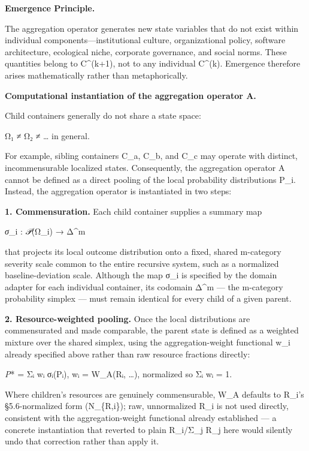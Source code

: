 \documentclass[
]{article}
\begin{document}
\textbf{Emergence Principle.}

The aggregation operator generates new state variables that do not exist
within individual components---institutional culture, organizational
policy, software architecture, ecological niche, corporate governance,
and social norms. These quantities belong to C\^{}(k+1), not to any
individual C\^{}(k). Emergence therefore arises mathematically rather
than metaphorically.

\textbf{Computational instantiation of the aggregation operator A.}

Child containers generally do not share a state space:

Ω₁ ≠ Ω₂ ≠ \ldots{} in general.

For example, sibling containers C\_a, C\_b, and C\_c may operate with
distinct, incommensurable localized states. Consequently, the
aggregation operator A cannot be defined as a direct pooling of the
local probability distributions P\_i. Instead, the aggregation operator
is instantiated in two steps:

\textbf{1. Commensuration.} Each child container supplies a summary map

\emph{σ}\_i : \emph{𝒫}(Ω\_i) → Δ\^{}m

that projects its local outcome distribution onto a fixed, shared
m-category severity scale common to the entire recursive system, such as
a normalized baseline-deviation scale. Although the map σ\_i is
specified by the domain adapter for each individual container, its
codomain Δ\^{}m --- the m-category probability simplex --- must remain
identical for every child of a given parent.

\textbf{2. Resource-weighted pooling.} Once the local distributions are
commensurated and made comparable, the parent state is defined as a
weighted mixture over the shared simplex, using the aggregation-weight
functional w\_i already specified above rather than raw resource
fractions directly:

\emph{P}* = Σᵢ wᵢ σᵢ(Pᵢ), wᵢ = W\_A(Rᵢ, \ldots), normalized so Σᵢ wᵢ =
1.

Where children's resources are genuinely commensurable, W\_A defaults to
R\_i's §5.6-normalized form (N\_\{R,i\}); raw, unnormalized R\_i is not
used directly, consistent with the aggregation-weight functional already
established --- a concrete instantiation that reverted to plain
R\_i/Σ\_j R\_j here would silently undo that correction rather than
apply it.
\end{document}
